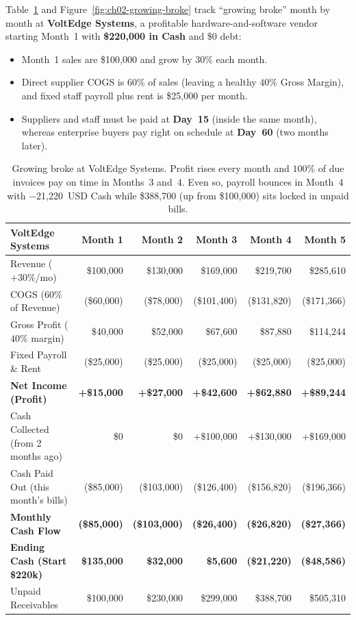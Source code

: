 Table~\ref{tab:ch02-voltedge-bankruptcy} and Figure~\ref{fig:ch02-growing-broke} track ``growing broke'' month by month at \textbf{VoltEdge Systems}, a profitable hardware-and-software vendor starting Month~1 with \textbf{\$220,000 in Cash} and \$0 debt:
\begin{itemize}
  \item Month~1 sales are \$100,000 and grow by $30\%$ each month.
  \item Direct supplier COGS is $60\%$ of sales (leaving a healthy $40\%$ Gross Margin), and fixed staff payroll plus rent is \$25,000 per month.
  \item Suppliers and staff must be paid at \textbf{Day~15} (inside the same month), whereas enterprise buyers pay right on schedule at \textbf{Day~60} (two months later).
\end{itemize}



\begin{table}[htbp]
\centering
\small
\begin{tabular}{@{}lrrrrr@{}}
\toprule
\textbf{VoltEdge Systems} & \textbf{Month 1} & \textbf{Month 2} & \textbf{Month 3} & \textbf{Month 4} & \textbf{Month 5} \\
\midrule
Revenue ($+30\%$/mo)             & \$100,000  & \$130,000  & \$169,000  & \$219,700  & \$285,610  \\
COGS ($60\%$ of Revenue)         & (\$60,000) & (\$78,000) & (\$101,400) & (\$131,820) & (\$171,366) \\
Gross Profit ($40\%$ margin)     & \$40,000   & \$52,000   & \$67,600   & \$87,880   & \$114,244  \\
Fixed Payroll \& Rent            & (\$25,000) & (\$25,000) & (\$25,000) & (\$25,000) & (\$25,000) \\
\textbf{Net Income (Profit)}     & \textbf{+\$15,000} & \textbf{+\$27,000} & \textbf{+\$42,600} & \textbf{+\$62,880} & \textbf{+\$89,244} \\
\midrule
Cash Collected (from 2 months ago) & \$0        & \$0        & +\$100,000 & +\$130,000 & +\$169,000 \\
Cash Paid Out (this month's bills) & (\$85,000) & (\$103,000) & (\$126,400) & (\$156,820) & (\$196,366) \\
\textbf{Monthly Cash Flow}       & \textbf{(\$85,000)} & \textbf{(\$103,000)} & \textbf{(\$26,400)} & \textbf{(\$26,820)} & \textbf{(\$27,366)} \\
\midrule
\textbf{Ending Cash (Start \$220k)} & \textbf{\$135,000} & \textbf{\$32,000} & \textbf{\$5,600} & \textbf{(\$21,220)} & \textbf{(\$48,586)} \\
Unpaid Receivables               & \$100,000  & \$230,000  & \$299,000  & \$388,700  & \$505,310  \\
\bottomrule
\end{tabular}
\caption{Growing broke at VoltEdge Systems. Profit rises every month and $100\%$ of due invoices pay on time in Months~3 and~4. Even so, payroll bounces in Month~4 with $-$21,220~USD Cash while \$388,700 (up from \$100,000) sits locked in unpaid bills.}
\label{tab:ch02-voltedge-bankruptcy}
\end{table}

